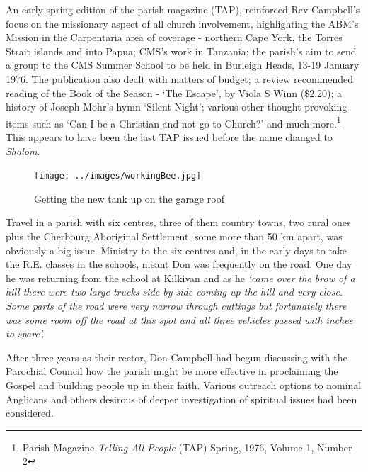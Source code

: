 An early spring edition of the parish magazine (TAP), reinforced Rev Campbell's focus on the missionary aspect of all church involvement, highlighting the ABM's Mission in the Carpentaria area of coverage - northern Cape York, the Torres Strait islands and into Papua; CMS's work in Tanzania; the parish's aim to send a group to the CMS Summer School to be held in Burleigh Heads, 13-19 January 1976. The publication also dealt with matters of budget; a review recommended reading of the Book of the Season - `The Escape', by Viola S Winn (\$2.20); a history of Joseph Mohr's hymn `Silent Night'; various other thought-provoking items such as `Can I be a Christian and not go to Church?' and much more.\footnote{Parish Magazine \emph{Telling All People} (TAP) Spring, 1976, Volume 1, Number 2} This appears to have been the last TAP issued before the name changed to \emph{Shalom}.








\begin{figure}[!htb]
\begin{center}
\texttt{[image: ../images/workingBee.jpg]}
\caption{Getting the new tank up on the garage roof}
\end{center}
\end{figure}




Travel in a parish with six centres, three of them country towns, two rural ones plus the Cherbourg Aboriginal Settlement, some more than 50 km apart, was obviously a big issue. Ministry to the six centres and, in the early days to take the R.E. classes in the schools, meant Don was frequently on the road. One day he was returning from the school at Kilkivan and as he \emph{`came over the brow of a hill there were two large trucks side by side coming up the hill and very close. Some parts of the road were very narrow through cuttings but fortunately there was some room off the road at this spot and all three vehicles passed with inches to spare'.}



After three years as their rector, Don Campbell had begun discussing with the Parochial Council how the parish might be more effective in proclaiming the Gospel and building people up in their faith. Various outreach options to nominal Anglicans and others desirous of deeper investigation of spiritual issues had been considered.



